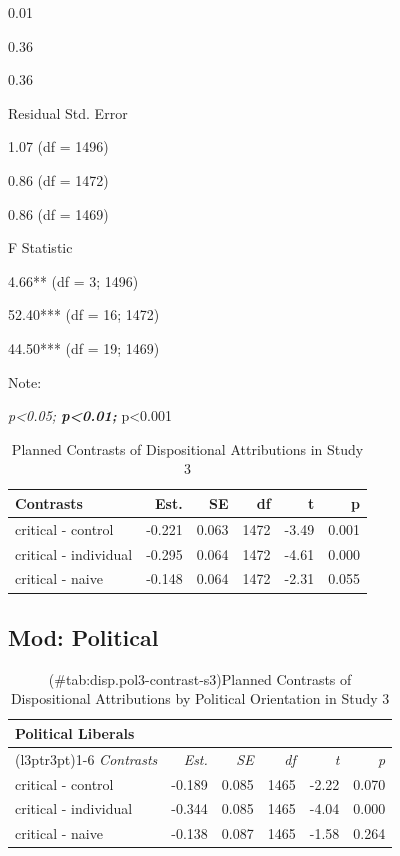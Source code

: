 \documentclass[
]{book}
\begin{document}
0.01

0.36

0.36

Residual Std. Error

1.07 (df = 1496)

0.86 (df = 1472)

0.86 (df = 1469)

F Statistic

4.66** (df = 3; 1496)

52.40*** (df = 16; 1472)

44.50*** (df = 19; 1469)

Note:

\emph{p\textless0.05; \textbf{p\textless0.01; }}p\textless0.001

\begin{table}

\caption{\label{tab:disp-contrast-s3}Planned Contrasts of Dispositional Attributions in Study 3}
\centering
\fontsize{13}{15}\selectfont
\begin{tabular}[t]{lrrrrr}
\toprule
Contrasts & Est. & SE & df & t & p\\
\midrule
critical - control & -0.221 & 0.063 & 1472 & -3.49 & 0.001\\
critical - individual & -0.295 & 0.064 & 1472 & -4.61 & 0.000\\
critical - naive & -0.148 & 0.064 & 1472 & -2.31 & 0.055\\
\bottomrule
\end{tabular}
\end{table}

\hypertarget{mod-political-16}{%
\subsection{Mod: Political}\label{mod-political-16}}

\begin{table}

\caption{(\#tab:disp.pol3-contrast-s3)Planned Contrasts of Dispositional Attributions by Political Orientation in Study 3}
\centering
\fontsize{13}{15}\selectfont
\begin{tabular}[t]{lrrrrr}
\toprule
\multicolumn{6}{l}{Political Liberals} \\
\cmidrule(l{3pt}r{3pt}){1-6}
\em{Contrasts} & \em{Est.} & \em{SE} & \em{df} & \em{t} & \em{p}\\
\midrule
critical - control & -0.189 & 0.085 & 1465 & -2.22 & 0.070\\
critical - individual & -0.344 & 0.085 & 1465 & -4.04 & 0.000\\
critical - naive & -0.138 & 0.087 & 1465 & -1.58 & 0.264\\
\bottomrule
\end{tabular}
\end{table}
\end{document}
